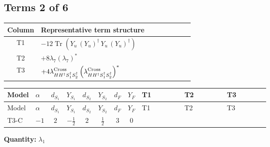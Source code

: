 \documentclass[8pt]{article}
\begin{document}
\begin{landscape}
\subsection*{Terms 2 of 6}
\begin{center}
\begin{tabular}{@{}c >{\raggedright\arraybackslash}p{0.82\linewidth}@{}}
\toprule
Column & Representative term structure \\
\midrule
T1 & \(\displaystyle -12 \operatorname{Tr}\!\left({Y_u}\,\left({Y_u}\right)^{\dagger}\,{Y_u}\,\left({Y_u}\right)^{\dagger}\right)\) \\
\midrule
T2 & \(\displaystyle +8 {\lambda_{7}} \left({\lambda_{7}}\right)^{*}\) \\
\midrule
T3 & \(\displaystyle +4 {\lambda_{H H^\dagger S_1^\dagger S_2^\dagger}^{\rm Cross}} \left({\lambda_{H H^\dagger S_1^\dagger S_2^\dagger}^{\rm Cross}}\right)^{*}\) \\
\midrule
\bottomrule
\end{tabular}
\end{center}
\smallskip
\tiny
\begin{longtable}{@{}llcccccc >{\raggedright\arraybackslash}p{0.21\linewidth} >{\raggedright\arraybackslash}p{0.21\linewidth} >{\raggedright\arraybackslash}p{0.21\linewidth}@{}}
\toprule
Model & $\alpha$ & $d_{S_1}$ & $Y_{S_1}$ & $d_{S_2}$ & $Y_{S_2}$ & $d_F$ & $Y_F$ & T1 & T2 & T3 \\
\midrule
\endfirsthead
\toprule
Model & $\alpha$ & $d_{S_1}$ & $Y_{S_1}$ & $d_{S_2}$ & $Y_{S_2}$ & $d_F$ & $Y_F$ & T1 & T2 & T3 \\
\midrule
\endhead
T3-C & $-1$ & $2$ & $-\frac{1}{2}$ & $2$ & $\frac{1}{2}$ & $3$ & $0$ & \scriptsize\adjustbox{max width=\linewidth}{$\begin{gathered} -12 \operatorname{Tr}\!\left({Y_u}\,\left({Y_u}\right)^{\dagger}\,{Y_u}\,\left({Y_u}\right)^{\dagger}\right)\end{gathered}$} & \scriptsize\adjustbox{max width=\linewidth}{$\begin{gathered} +8 {\lambda_{7}} \left({\lambda_{7}}\right)^{*}\end{gathered}$} & \scriptsize\adjustbox{max width=\linewidth}{$\begin{gathered} +4 {\lambda_{H H^\dagger S_1^\dagger S_2^\dagger}^{\rm Cross}} \left({\lambda_{H H^\dagger S_1^\dagger S_2^\dagger}^{\rm Cross}}\right)^{*}\end{gathered}$} \\
\midrule
\bottomrule
\end{longtable}
\clearpage
\noindent\textbf{Quantity: }$\lambda_1$\par\smallskip

\end{landscape}
\end{document}

